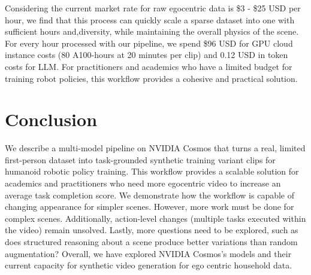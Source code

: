 \documentclass[runningheads]{llncs}
\begin{document}
Considering the current market rate for raw egocentric data is \$3 - \$25 USD per hour, we find that this process can quickly scale a sparse dataset into one with sufficient hours and,diversity, while maintaining the overall physics of the scene. For every hour processed with our pipeline, we spend \$96 USD for GPU cloud instance costs (80 A100-hours at 20 minutes per clip) and 0.12 USD in token costs for LLM. For practitioners and academics who have a limited budget for training robot policies, this workflow provides a cohesive and practical solution.

\section{Conclusion}

We describe a multi-model pipeline on NVIDIA Cosmos that turns a real, limited first-person dataset into task-grounded synthetic training variant clips for humanoid robotic policy training. This workflow provides a scalable solution for academics and practitioners who need more egocentric video to increase an average task completion score. We demonstrate how the workflow is capable of changing appearance for simpler scenes. However, more work must be done for complex scenes. Additionally, action-level changes (multiple tasks executed within the video) remain unsolved. Lastly, more questions need to be explored, such as does structured reasoning about a scene produce better variations than random augmentation? Overall, we have explored NVIDIA Cosmos's models and their current capacity for synthetic video generation for ego centric household data.
\end{document}
